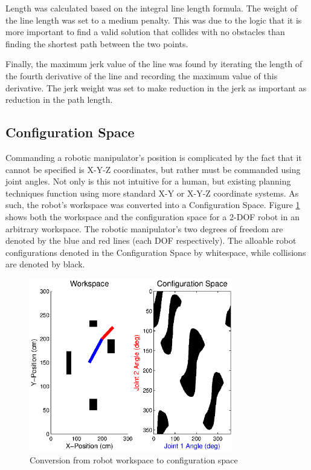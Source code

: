 Length was calculated based on the integral line length formula. The weight of the line length was set to a medium penalty. This was due to the logic that it is more important to find a valid solution that collides with no obstacles than finding the shortest path between the two points.

Finally, the maximum jerk value of the line was found by iterating the length of the fourth derivative of the line and recording the maximum value of this derivative. The jerk weight was set to make reduction in the jerk as important as reduction in the path length.

\subsection{Configuration Space}
Commanding a robotic manipulator's position is complicated by the fact that it cannot be specified is X-Y-Z coordinates, but rather must be commanded using joint angles. Not only is this not intuitive for a human, but existing planning techniques function using more standard X-Y or X-Y-Z coordinate systems. As such, the robot's workspace was converted into a Configuration Space. Figure \ref{fig:ws2cs} shows both the workspace and the configuration space for a 2-DOF robot in an arbitrary workspace. The robotic manipulator's two degrees of freedom are denoted by the blue and red lines (each DOF respectively). The alloable robot configurations denoted in the Configuration Space by whitespace, while collisions are denoted by black.

\begin{figure}[h]
	\centering
	\includegraphics[width=3.5in]{./figures/wp2cs.eps}
	\caption{Conversion from robot workspace to configuration space }
	\label{fig:ws2cs}
\end{figure}

